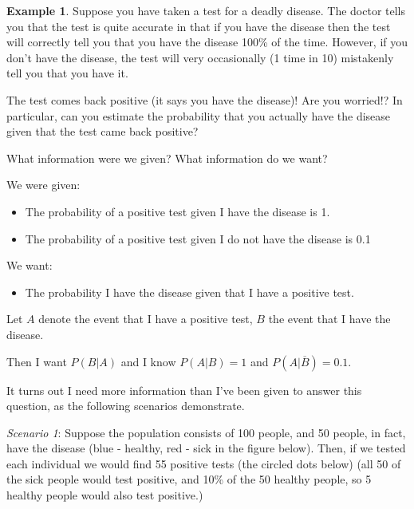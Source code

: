 \documentclass[
]{book}
\providecommand{\tightlist}{%
  \setlength{\itemsep}{0pt}\setlength{\parskip}{0pt}}
\theoremstyle{definition}
\theoremstyle{definition}
\newtheorem{example}{Example}[chapter]
\theoremstyle{definition}
\theoremstyle{definition}
\theoremstyle{remark}
\begin{document}
\begin{example}
\protect\hypertarget{exm:bayes-intro}{}\label{exm:bayes-intro}Suppose you have taken a test for a deadly disease. The doctor tells you that the test is quite accurate in that if you have the disease then the test will correctly tell you that you have the disease 100\% of the time. However, if you don't have the disease, the test will very occasionally (1 time in 10) mistakenly tell you that you have it.

The test comes back positive (it says you have the disease)! Are you worried!? In particular, can you estimate the probability that you actually have the disease given that the test came back positive?

What information were we given? What information do we want?

We were given:

\begin{itemize}
\tightlist
\item
  The probability of a positive test given I have the disease is 1.
\item
  The probability of a positive test given I do not have the disease is 0.1
\end{itemize}

We want:

\begin{itemize}
\tightlist
\item
  The probability I have the disease given that I have a positive test.
\end{itemize}

Let \(A\) denote the event that I have a positive test, \(B\) the event that I have the disease.

Then I want \(P(B|A)\) and I know \(P(A|B) = 1\) and \(P(A|\overline{B}) = 0.1.\)

It turns out I need more information than I've been given to answer this question, as the following scenarios demonstrate.

\emph{Scenario 1}: Suppose the population consists of 100 people, and 50 people, in fact, have the disease (blue - healthy, red - sick in the figure below). Then, if we tested each individual we would find 55 positive tests (the circled dots below) (all 50 of the sick people would test positive, and 10\% of the 50 healthy people, so 5 healthy people would also test positive.)


\end{example}
\end{document}
